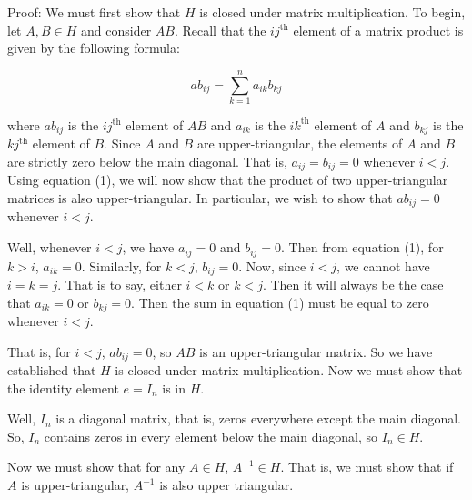 \documentclass{article}
\begin{document}
Proof: We must first show that $H$ is closed under matrix multiplication. To begin, let $A, B \in H$ and consider $AB$. Recall that the $ij^{\text{th}}$ element of a matrix product is given by the following formula:

\begin{equation}
    ab_{ij} = \sum_{k = 1}^n a_{ik}b_{kj}
\end{equation}

where $ab_{ij}$ is the $ij^{\text{th}}$ element of $AB$ and $a_{ik}$ is the $ik^{\text{th}}$ element of $A$ and $b_{kj}$ is the $kj^{\text{th}}$ element of $B$. Since $A$ and $B$ are upper-triangular, the elements of $A$ and $B$ are strictly zero below the main diagonal. That is, $a_{ij} = b_{ij} = 0$ whenever $i < j$. Using equation (1), we will now show that the product of two upper-triangular matrices is also upper-triangular. In particular, we wish to show that $ab_{ij} = 0$ whenever $i < j$.
\newline

Well, whenever $i < j$, we have $a_{ij} = 0$ and $b_{ij} = 0$. Then from equation (1), for $k > i$, $a_{ik} = 0$. Similarly, for $k < j$, $b_{ij} = 0$. Now, since $i < j$, we cannot have $i = k = j$. That is to say, either $i < k$ or $k < j$. Then it will always be the case that $a_{ik} = 0$ or $b_{kj} = 0$. Then the sum in equation (1) must be equal to zero whenever $i < j$.
\newline

That is, for $i < j$, $ab_{ij} = 0$, so $AB$ is an upper-triangular matrix. So we have established that $H$ is closed under matrix multiplication. Now we must show that the identity element $e = I_n$ is in $H$.
\newline

Well, $I_n$ is a diagonal matrix, that is, zeros everywhere except the main diagonal. So, $I_n$ contains zeros in every element below the main diagonal, so $I_n \in H$. 
\newline

Now we must show that for any $A \in H$, $A^{-1} \in H$. That is, we must show that if $A$ is upper-triangular, $A^{-1}$ is also upper triangular. 
\newline
\end{document}
